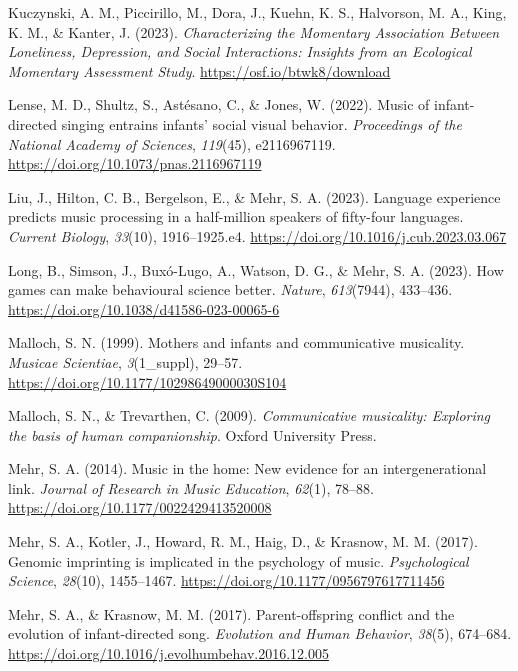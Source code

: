 \documentclass[
]{article}
\newlength{\cslhangindent}
\newenvironment{CSLReferences}[2] %
 {\begin{list}{}{%
  \setlength{\itemindent}{0pt}
  \setlength{\leftmargin}{0pt}
  \setlength{\parsep}{0pt}
  \ifodd #1
   \setlength{\leftmargin}{\cslhangindent}
   \setlength{\itemindent}{-1\cslhangindent}
  \fi
  \setlength{\itemsep}{#2\baselineskip}}}
 {\end{list}}
\begin{document}
\begin{CSLReferences}{1}{0}
Kuczynski, A. M., Piccirillo, M., Dora, J., Kuehn, K. S., Halvorson, M.
A., King, K. M., \& Kanter, J. (2023). \emph{Characterizing the
{Momentary} {Association} {Between} {Loneliness}, {Depression}, and
{Social} {Interactions}: {Insights} from an {Ecological} {Momentary}
{Assessment} {Study}}. \url{https://osf.io/btwk8/download}

Lense, M. D., Shultz, S., Astésano, C., \& Jones, W. (2022). Music of
infant-directed singing entrains infants' social visual behavior.
\emph{Proceedings of the National Academy of Sciences}, \emph{119}(45),
e2116967119. \url{https://doi.org/10.1073/pnas.2116967119}

Liu, J., Hilton, C. B., Bergelson, E., \& Mehr, S. A. (2023). Language
experience predicts music processing in a half-million speakers of
fifty-four languages. \emph{Current Biology}, \emph{33}(10),
1916--1925.e4. \url{https://doi.org/10.1016/j.cub.2023.03.067}

Long, B., Simson, J., Buxó-Lugo, A., Watson, D. G., \& Mehr, S. A.
(2023). How games can make behavioural science better. \emph{Nature},
\emph{613}(7944), 433--436.
\url{https://doi.org/10.1038/d41586-023-00065-6}

Malloch, S. N. (1999). Mothers and infants and communicative musicality.
\emph{Musicae Scientiae}, \emph{3}(1\_suppl), 29--57.
\url{https://doi.org/10.1177/10298649000030S104}

Malloch, S. N., \& Trevarthen, C. (2009). \emph{Communicative
musicality: Exploring the basis of human companionship}. Oxford
University Press.

Mehr, S. A. (2014). Music in the home: {New} evidence for an
intergenerational link. \emph{Journal of Research in Music Education},
\emph{62}(1), 78--88. \url{https://doi.org/10.1177/0022429413520008}

Mehr, S. A., Kotler, J., Howard, R. M., Haig, D., \& Krasnow, M. M.
(2017). Genomic imprinting is implicated in the psychology of music.
\emph{Psychological Science}, \emph{28}(10), 1455--1467.
\url{https://doi.org/10.1177/0956797617711456}

Mehr, S. A., \& Krasnow, M. M. (2017). Parent-offspring conflict and the
evolution of infant-directed song. \emph{Evolution and Human Behavior},
\emph{38}(5), 674--684.
\url{https://doi.org/10.1016/j.evolhumbehav.2016.12.005}


\end{CSLReferences}
\end{document}
